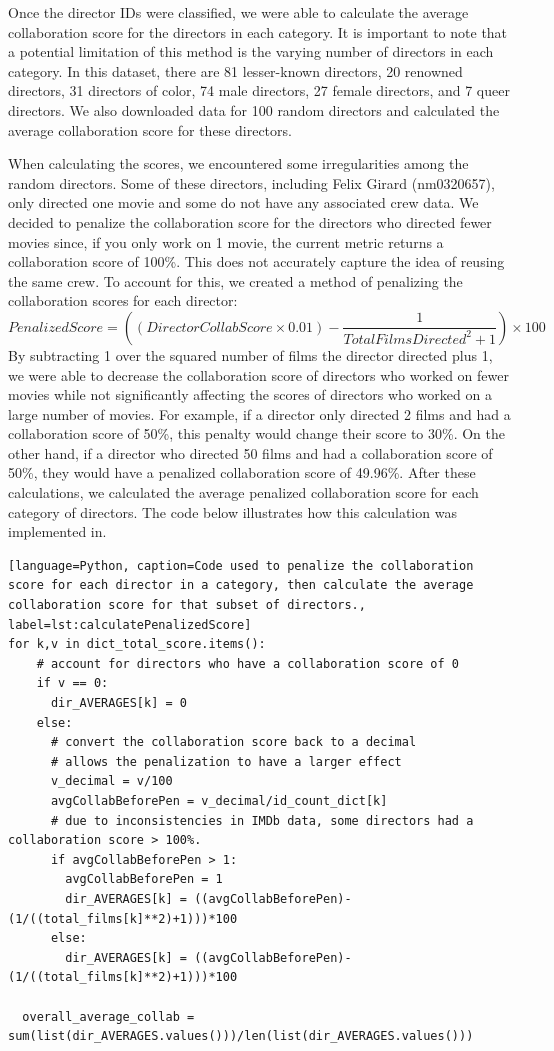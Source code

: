 \documentclass[12pt]{article}
\begin{document}
Once the director IDs were classified, we were able to calculate the average collaboration score for the directors in each category. It is important to note that a potential limitation of this method is the varying number of directors in each category. In this dataset, there are 81 lesser-known directors, 20 renowned directors,   31 directors of color,  74 male directors, 27 female directors, and 7 queer directors. We also downloaded data for 100 random directors and calculated the average collaboration score for these directors.
\par
When calculating the scores, we encountered some irregularities among the random directors. Some of these directors, including Felix Girard (nm0320657), only directed one movie and some do not have any associated crew data. We decided to penalize the collaboration score for the directors who directed fewer movies since, if you only work on 1 movie, the current metric returns a collaboration score of 100\%. This does not accurately capture the idea of reusing the same crew. To account for this, we created a method of penalizing the collaboration scores for each director:
\begin{equation} \label{eq:avgCollaboration_score}
    PenalizedScore = ((Director Collab Score\times0.01) - \frac{1}{Total Films Directed^2 + 1})\times100
\end{equation}
By subtracting 1 over the squared number of films the director directed plus 1, we were able to decrease the collaboration score of directors who worked on fewer movies while not significantly affecting the scores of directors who worked on a large number of movies. For example, if a director only directed 2 films and had a collaboration score of 50\%, this penalty would change their score to 30\%. On the other hand, if a director who directed 50 films and had a collaboration score of 50\%, they would have a penalized collaboration score of 49.96\%. After these calculations, we calculated the average penalized collaboration score for each category of directors. The code below illustrates how this calculation was implemented in.

\begin{lstlisting}[language=Python, caption=Code used to penalize the collaboration score for each director in a category, then calculate the average collaboration score for that subset of directors., label=lst:calculatePenalizedScore] 
for k,v in dict_total_score.items():
    # account for directors who have a collaboration score of 0
    if v == 0:
      dir_AVERAGES[k] = 0
    else:
      # convert the collaboration score back to a decimal 
      # allows the penalization to have a larger effect
      v_decimal = v/100
      avgCollabBeforePen = v_decimal/id_count_dict[k]
      # due to inconsistencies in IMDb data, some directors had a collaboration score > 100%. 
      if avgCollabBeforePen > 1:
        avgCollabBeforePen = 1
        dir_AVERAGES[k] = ((avgCollabBeforePen)-(1/((total_films[k]**2)+1)))*100
      else:
        dir_AVERAGES[k] = ((avgCollabBeforePen)-(1/((total_films[k]**2)+1)))*100

  overall_average_collab = sum(list(dir_AVERAGES.values()))/len(list(dir_AVERAGES.values()))
\end{lstlisting}
\end{document}
